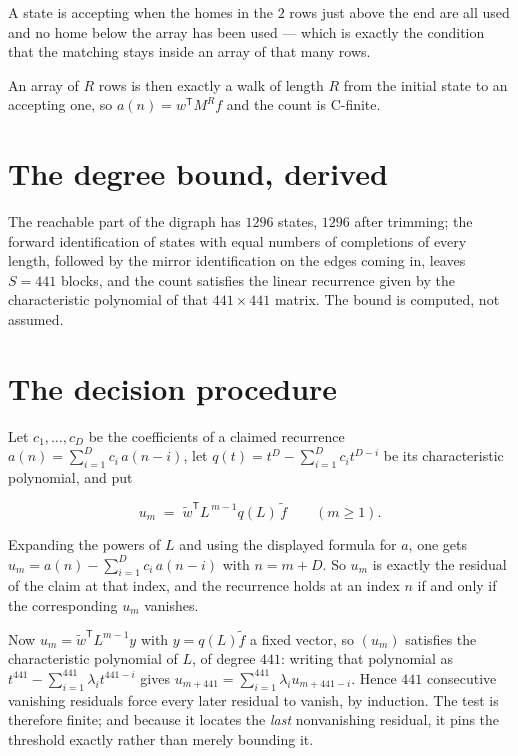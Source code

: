 \documentclass[11pt]{article}
\theoremstyle{definition}
\begin{document}
A state is accepting when the homes in the $2$ rows just above the end are all used and no home below the array has been used --- which is exactly the condition that the matching stays inside an array of that many rows.

An array of $R$ rows is then exactly a walk of length $R$ from the initial state to an accepting one, so $a(n) = w^{\mathsf T}M^{R}f$ and the count is C-finite.

\section{The degree bound, derived}

The reachable part of the digraph has $1296$ states, $1296$ after trimming; the forward identification of states with equal numbers of completions of every length, followed by the mirror identification on the edges coming in, leaves $S = 441$ blocks, and the count satisfies the linear recurrence given by the characteristic polynomial of that $441\times441$ matrix. The bound is computed, not assumed.

\section{The decision procedure}

Let $c_1,\dots,c_D$ be the coefficients of a claimed recurrence $a(n) = \sum_{i=1}^{D} c_i\,a(n-i)$, let $q(t) = t^{D} - \sum_{i=1}^{D} c_i t^{D-i}$ be its characteristic polynomial, and put

\[u_m \;=\; \tilde w^{\mathsf T} L^{\,m-1} q(L)\,\tilde f \qquad (m \ge 1).\]

Expanding the powers of $L$ and using the displayed formula for $a$, one gets $u_m = a(n) - \sum_{i=1}^{D} c_i\,a(n-i)$ with $n = m + D$. So $u_m$ is exactly the residual of the claim at that index, and the recurrence holds at an index $n$ if and only if the corresponding $u_m$ vanishes.

Now $u_m = \tilde w^{\mathsf T} L^{m-1} y$ with $y = q(L)\tilde f$ a fixed vector, so $(u_m)$ satisfies the characteristic polynomial of $L$, of degree $441$: writing that polynomial as $t^{441} - \sum_{i=1}^{441} \lambda_i t^{441-i}$ gives $u_{m+441} = \sum_{i=1}^{441} \lambda_i u_{m+441-i}$. Hence $441$ consecutive vanishing residuals force every later residual to vanish, by induction. The test is therefore finite; and because it locates the {\itshape last} nonvanishing residual, it pins the threshold exactly rather than merely bounding it.
\end{document}
